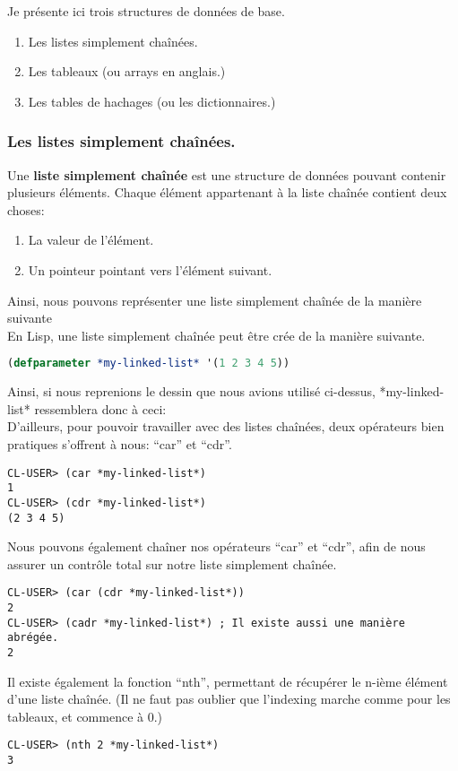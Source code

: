 \documentclass[a4paper, 12pt]{article}
\numberwithin{equation}{subsection}
\begin{document}
Je présente ici trois structures de données de base.
\begin{enumerate}
  \item Les listes simplement chaînées.
  \item Les tableaux (ou arrays en anglais.)
  \item Les tables de hachages (ou les dictionnaires.) \\[0.2cm]
\end{enumerate}

\subsubsection{Les listes simplement chaînées.}
Une {\bf liste simplement chaînée} est une structure de données pouvant contenir plusieurs éléments. Chaque élément appartenant à la liste chaînée contient deux choses:
\begin{enumerate}
  \item La valeur de l'élément.
  \item Un pointeur pointant vers l'élément suivant. \\[0.2cm]
\end{enumerate}

Ainsi, nous pouvons représenter une liste simplement chaînée de la manière suivante \\[0.5cm]

En Lisp, une liste simplement chaînée peut être crée de la manière suivante. \\[0.2cm]
\begin{lstlisting}[language=Lisp]
(defparameter *my-linked-list* '(1 2 3 4 5))
\end{lstlisting}
Ainsi, si nous reprenions le dessin que nous avions utilisé ci-dessus,
*my-linked-list* ressemblera donc à ceci: \\[0.5cm]


D'ailleurs, pour pouvoir travailler avec des listes chaînées, deux opérateurs bien pratiques s'offrent à nous: ``car'' et ``cdr''. \\[0.2cm]
\begin{lstlisting}[language=LISP]
CL-USER> (car *my-linked-list*)
1
CL-USER> (cdr *my-linked-list*)
(2 3 4 5)
\end{lstlisting}
Nous pouvons également chaîner nos opérateurs ``car'' et ``cdr'', afin de nous assurer un contrôle total sur notre liste simplement chaînée.
\begin{lstlisting}[language=LISP]
CL-USER> (car (cdr *my-linked-list*))
2
CL-USER> (cadr *my-linked-list*) ; Il existe aussi une manière abrégée.
2
\end{lstlisting}
Il existe également la fonction ``nth'', permettant de récupérer le n-ième élément d'une liste chaînée. (Il ne faut pas oublier que l'indexing marche comme pour les tableaux, et commence à 0.)
\begin{lstlisting}[language=LISP]
CL-USER> (nth 2 *my-linked-list*)
3
\end{lstlisting}
\end{document}
